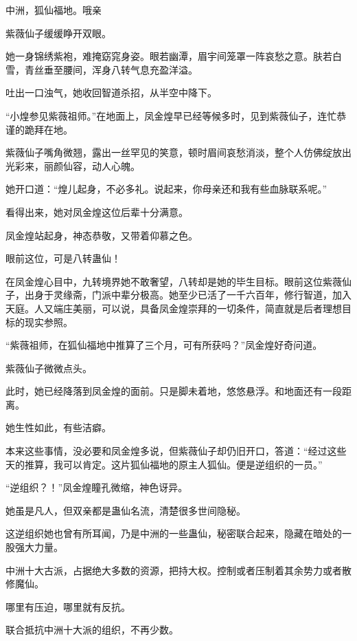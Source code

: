 
\begin{this_body}



中洲，狐仙福地。哦亲

紫薇仙子缓缓睁开双眼。

她一身锦绣紫袍，难掩窈窕身姿。眼若幽潭，眉宇间笼罩一阵哀愁之意。肤若白雪，青丝垂至腰间，浑身八转气息充盈洋溢。

吐出一口浊气，她收回智道杀招，从半空中降下。

“小煌参见紫薇祖师。”在地面上，凤金煌早已经等候多时，见到紫薇仙子，连忙恭谨的跪拜在地。

紫薇仙子嘴角微翘，露出一丝罕见的笑意，顿时眉间哀愁消淡，整个人仿佛绽放出光彩来，丽颜仙容，动人心魄。

她开口道：“煌儿起身，不必多礼。说起来，你母亲还和我有些血脉联系呢。”

看得出来，她对凤金煌这位后辈十分满意。

凤金煌站起身，神态恭敬，又带着仰慕之色。

眼前这位，可是八转蛊仙！

在凤金煌心目中，九转境界她不敢奢望，八转却是她的毕生目标。眼前这位紫薇仙子，出身于灵缘斋，门派中辈分极高。她至少已活了一千六百年，修行智道，加入天庭。人又端庄美丽，可以说，具备凤金煌崇拜的一切条件，简直就是后者理想目标的现实参照。

“紫薇祖师，在狐仙福地中推算了三个月，可有所获吗？”凤金煌好奇问道。

紫薇仙子微微点头。

此时，她已经降落到凤金煌的面前。只是脚未着地，悠悠悬浮。和地面还有一段距离。

她生性如此，有些洁癖。

本来这些事情，没必要和凤金煌多说，但紫薇仙子却仍旧开口，答道：“经过这些天的推算，我可以肯定。这片狐仙福地的原主人狐仙。便是逆组织的一员。”

“逆组织？！”凤金煌瞳孔微缩，神色讶异。

她虽是凡人，但双亲都是蛊仙名流，清楚很多世间隐秘。

这逆组织她也曾有所耳闻，乃是中洲的一些蛊仙，秘密联合起来，隐藏在暗处的一股强大力量。

中洲十大古派，占据绝大多数的资源，把持大权。控制或者压制着其余势力或者散修魔仙。

哪里有压迫，哪里就有反抗。

联合抵抗中洲十大派的组织，不再少数。


\end{this_body}
